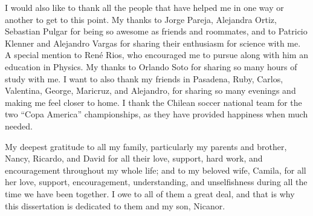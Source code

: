 \documentclass[14pt]{caltech_thesis}
\begin{document}
\begin{acknowledgements}
I would also like to thank all the people that have helped me in one
way or another to get to this point. My thanks to Jorge Pareja, Alejandra Ortiz,
Sebastian Pulgar for being so awesome as friends and roommates, and  to
Patricio Klenner and Alejandro Vargas for sharing their enthusiasm for
science with me. A special mention to Ren\'e Rios, who encouraged me
to pursue along with him an education in Physics. My thanks to Orlando Soto for
sharing so many hours of study with me. I want to also thank my
friends in Pasadena, Ruby, Carlos, Valentina, George, Maricruz, and
Alejandro, for sharing so many evenings and making me feel closer to
home. I thank the Chilean soccer national team for the two ``Copa
America'' championships, as they have provided happiness when much
needed.

My deepest gratitude to all my family, particularly my parents and brother,
Nancy, Ricardo, and David for all their love, support, hard work, and
encouragement throughout my whole life; and to my beloved wife, Camila,
for all her love, support, encouragement, understanding, and
unselfishness during all the time we have been together. I owe to all
of them a great deal, and that is why this
dissertation is dedicated to them and my son, Nicanor.
 

\end{acknowledgements}
\end{document}
